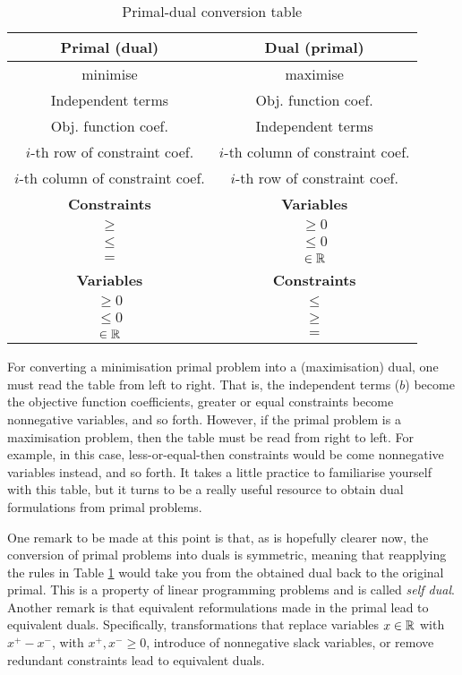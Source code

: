 \begin{table}[h]
	\begin{tabular}{|c|c|} \hline
		{\bf Primal (dual)} & {\bf Dual (primal)} \\ \hline
		 minimise & maximise \\
		Independent terms  & Obj. function coef.  \\
		Obj. function coef.  & Independent terms  \\
		$i$-th row of constraint coef. & $i$-th column of constraint coef. \\
		$i$-th column of constraint coef. & $i$-th row of constraint coef. \\ \hline
		{\bf Constraints} & {\bf Variables} \\ \hline
		$\geq$ & $\geq 0$ \\
		$\leq$ & $\leq 0$ \\
		$=$ & $\in \mathbb{R}$ \\ \hline
		{\bf Variables} & {\bf Constraints} \\ \hline
		$\geq 0$ & $\leq$ \\
		$\leq 0$ & $\geq$ \\
		$\in \mathbb{R}$ & $=$ \\ \hline
	\end{tabular}
	\caption{Primal-dual conversion table} \label{p1c5:tab:primal-dual_conversion}
\end{table}

For converting a minimisation primal problem into a (maximisation) dual, one must read the table from left to right. That is, the independent terms ($b$) become the objective function coefficients, greater or equal constraints become nonnegative variables, and so forth. However, if the primal problem is a maximisation problem, then the table must be read from right to left. For example, in this case, less-or-equal-then constraints would be come nonnegative variables instead, and so forth. It takes a little practice to familiarise yourself with this table, but it turns to be a really useful resource to obtain dual formulations from primal problems.

One remark to be made at this point is that, as is hopefully clearer now, the conversion of primal problems into duals is symmetric, meaning that reapplying the rules in Table \ref{p1c5:tab:primal-dual_conversion} would take you from the obtained dual back to the original primal. This is a property of linear programming problems and is called \emph{self dual}. Another remark is that equivalent reformulations made in the primal lead to equivalent duals. Specifically, transformations that replace variables $x \in \mathbb{R}$ with $x^+ - x^-$, with $x^+, x^- \geq 0$, introduce of nonnegative slack variables, or remove redundant constraints lead to equivalent duals. 

